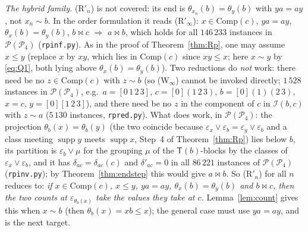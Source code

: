 \documentclass[11pt]{amsart}
\theoremstyle{definition}
\renewcommand{\P}{\mathcal{P}}
\newcommand{\supp}{\operatorname{supp}}
\newcommand{\T}{\mathsf{T}}
\newcommand{\mt}{\bowtie}   %
\begin{document}
\emph{The hybrid family.} (R$'_n$) is not covered: its end is $\theta_{x_n}(b)=\theta_y(b)$ with $ya=ay$, not $x_n\sim b$. In the order formulation it reads (R$'_\infty$): $x\in\mathrm{Comp}(c)$, $ya=ay$, $\theta_x(b)=\theta_y(b)$, $b\mt c$ $\Rightarrow$ $a\mt b$, which holds for all $146\,233$ instances in $\P(\P_4)$ (\texttt{rpinf.py}). As in the proof of Theorem~\ref{thm:Rp}, one may assume $x\le y$ (replace $x$ by $xy$, which lies in $\mathrm{Comp}(c)$ since $xy\le x$; here $x\sim y$ by \eqref{eq:Q1}, both lying above $\theta_x(b)=\theta_y(b)$). Two reductions do \emph{not} work: there need be no $z\in\mathrm{Comp}(c)$ with $z\sim b$ (so (W$_\infty$) cannot be invoked directly; $1\,528$ instances in $\P(\P_4)$, e.g.\ $a=[0\,1\,2\,3]$, $c=[0](1\,2\,3)$, $b=[0](1)(2\,3)$, $x=c$, $y=[0][1\,2\,3]$), and there need be no $z$ in the component of $c$ in $\mathcal I(b,c)$ with $z\sim a$ ($5\,130$ instances, \texttt{rpred.py}). What does work, in $\P(\P_4)$: the projection $\theta_b(x)=\theta_b(y)$ (the two coincide because $\varepsilon_x\vee\varepsilon_b=\varepsilon_y\vee\varepsilon_b$ and a class meeting $\supp y$ meets $\supp x$, Step~4 of Theorem~\ref{thm:Rp}) lies below $b$, its partition is $\varepsilon_b\vee\mu$ for the grouping $\mu$ of the $\T(b)$-blocks by the classes of $\varepsilon_x\vee\varepsilon_b$, and it has $\delta_{ac}=\delta_{ac}(c)$ and $\delta'_{ac}=0$ in all $86\,221$ instances of $\P(\P_4)$ (\texttt{rpinv.py}); by Theorem~\ref{thm:endstep} this would give $a\mt b$. So (R$'_n$) for all $n$ reduces to: \emph{if $x\in\mathrm{Comp}(c)$, $x\le y$, $ya=ay$, $\theta_x(b)=\theta_y(b)$ and $b\mt c$, then the two counts at $\varepsilon_{\theta_b(x)}$ take the values they take at $c$.} Lemma~\ref{lem:count} gives this when $x\sim b$ (then $\theta_b(x)=xb\le x$); the general case must use $ya=ay$, and is the next target.
\end{document}
